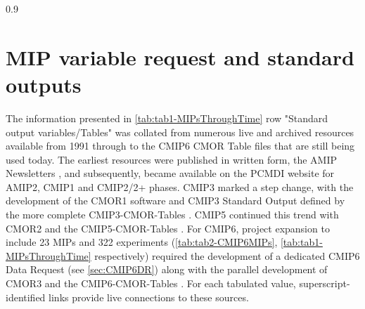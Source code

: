 \documentclass[gmd, preprint]{copernicus}
\begin{document}
\begin{table}[htp]
{\begin{tabularx}{0.9\textwidth}
			\hline		
		\end{tabularx}
	} %
	\label{tab:tabAppA1-MIPExperiments}
\end{table}


\section{MIP variable request and standard outputs}    %
\label{sec:secAppB1-MIPStandardOutput}
The information presented in \autoref{tab:tab1-MIPsThroughTime} row "Standard output variables/Tables" was collated from numerous live and archived resources available from 1991 through to the CMIP6 CMOR Table files that are still being used today. The earliest resources were published in written form, the AMIP Newsletters \citep[e.g.,][]{gates_amip_1991}, and subsequently, became available on the PCMDI website for AMIP2, CMIP1 and CMIP2/2+ phases. CMIP3 marked a step change, with the development of the CMOR1 software \citep{taylor_cmor_2006} and CMIP3 Standard Output defined by the more complete CMIP3-CMOR-Tables \citep{doutriaux_cmip3_2005}. CMIP5 continued this trend with CMOR2 \citep{doutriaux_cmor_2011} and the CMIP5-CMOR-Tables \citep{doutriaux_cmip5_2013}. For CMIP6, project expansion to include 23 MIPs and 322 experiments (\autoref{tab:tab2-CMIP6MIPs}, \autoref{tab:tab1-MIPsThroughTime} respectively) required the development of a dedicated CMIP6 Data Request (see \autoref{sec:CMIP6DR}) along with the parallel development of CMOR3 \citep{mauzey_cmor_2024} and the CMIP6-CMOR-Tables \citep{nadeau_cmip6_2017}. For each tabulated value, superscript-identified links provide live connections to these sources.
\end{document}
